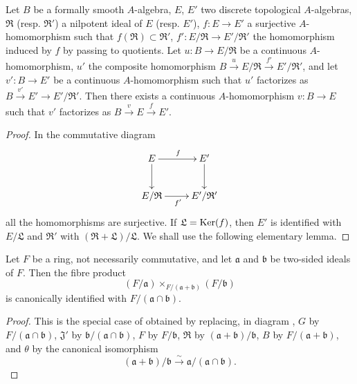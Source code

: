 \begin{lemma}[19.3.10.1]
\label{0.19.3.10.1}
Let $B$ be a formally smooth $A$-algebra, $E$, $E'$ two discrete topological $A$-algebras, $\mathfrak{R}$ (resp. $\mathfrak{R}'$) a nilpotent ideal of $E$ (resp. $E'$), $f:E\to E'$ a surjective $A$-homomorphism such that $f(\mathfrak{R})\subset\mathfrak{R}'$, $f':E/\mathfrak{R}\to E'/\mathfrak{R}'$ the homomorphism induced by $f$ by passing to quotients.
Let $u:B\to E/\mathfrak{R}$ be a continuous $A$-homomorphism, $u'$ the composite homomorphism $B\xrightarrow{u}E/\mathfrak{R}\xrightarrow{f'}E'/\mathfrak{R}'$, and let $v':B\to E'$ be a continuous $A$-homomorphism such that $u'$ factorizes as $B\xrightarrow{v'}E'\to E'/\mathfrak{R}'$.
Then there exists a continuous $A$-homomorphism $v:B\to E$ such that $v'$ factorizes as $B\xrightarrow{v}E\xrightarrow{f}E'$.
\end{lemma}

\begin{proof}
In the commutative diagram
\[
\xymatrix{
  E \ar[r]^f \ar[d] & E' \ar[d] \\
  E/\mathfrak{R} \ar[r]_{f'} & E'/\mathfrak{R}'
}
\]
all the homomorphisms are surjective.
If $\mathfrak{L}=\operatorname{Ker}(f)$, then $E'$ is identified with $E/\mathfrak{L}$ and $\mathfrak{R}'$ with $(\mathfrak{R}+\mathfrak{L})/\mathfrak{L}$.
We shall use the following elementary lemma.
\end{proof}

\begin{lemma}[19.3.10.2]
\label{0.19.3.10.2}
Let $F$ be a ring, not necessarily commutative, and let $\mathfrak{a}$ and $\mathfrak{b}$ be two-sided ideals of $F$.
Then the fibre product
\[
  (F/\mathfrak{a})\times_{F/(\mathfrak{a}+\mathfrak{b})}(F/\mathfrak{b})
\]
is canonically identified with $F/(\mathfrak{a}\cap\mathfrak{b})$.
\end{lemma}

\begin{proof}
This is the special case of  obtained by replacing, in diagram , $G$ by $F/(\mathfrak{a}\cap\mathfrak{b})$, $\mathfrak{J}'$ by $\mathfrak{b}/(\mathfrak{a}\cap\mathfrak{b})$, $F$ by $F/\mathfrak{b}$, $\mathfrak{R}$ by $(\mathfrak{a}+\mathfrak{b})/\mathfrak{b}$, $B$ by $F/(\mathfrak{a}+\mathfrak{b})$, and $\theta$ by the canonical isomorphism
\[
  (\mathfrak{a}+\mathfrak{b})/\mathfrak{b}\xrightarrow{\sim}\mathfrak{a}/(\mathfrak{a}\cap\mathfrak{b}).
\]
\end{proof}


